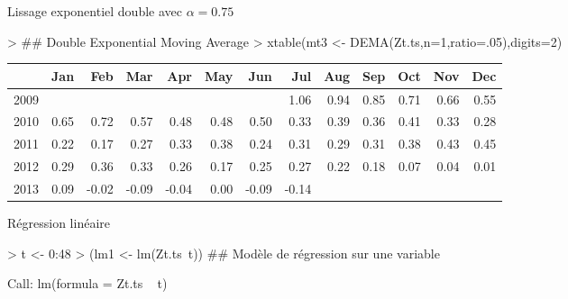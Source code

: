 \begin{solution}{1.1}
\begin{enumerate}
\begin{Schunk}
\begin{table}[ht]
\begin{tabular}{rrrrrrrrrrrrr}
   \hline
\end{tabular}
\end{table}\end{Schunk}
Lissage exponentiel double avec $\alpha=0.75$
\begin{Schunk}
\begin{Sinput}
> ## Double Exponential Moving Average
> xtable(mt3 <- DEMA(Zt.ts,n=1,ratio=.05),digits=2)
\end{Sinput}
\begin{table}[ht]
\centering
\begin{tabular}{rrrrrrrrrrrrr}
  \hline
 & Jan & Feb & Mar & Apr & May & Jun & Jul & Aug & Sep & Oct & Nov & Dec \\
  \hline
2009 &  &  &  &  &  &  & 1.06 & 0.94 & 0.85 & 0.71 & 0.66 & 0.55 \\
  2010 & 0.65 & 0.72 & 0.57 & 0.48 & 0.48 & 0.50 & 0.33 & 0.39 & 0.36 & 0.41 & 0.33 & 0.28 \\
  2011 & 0.22 & 0.17 & 0.27 & 0.33 & 0.38 & 0.24 & 0.31 & 0.29 & 0.31 & 0.38 & 0.43 & 0.45 \\
  2012 & 0.29 & 0.36 & 0.33 & 0.26 & 0.17 & 0.25 & 0.27 & 0.22 & 0.18 & 0.07 & 0.04 & 0.01 \\
  2013 & 0.09 & -0.02 & -0.09 & -0.04 & 0.00 & -0.09 & -0.14 &  &  &  &  &  \\
   \hline
\end{tabular}
\end{table}\end{Schunk}
Régression linéaire
\begin{Schunk}
\begin{Sinput}
> t <- 0:48
> (lm1 <- lm(Zt.ts~t)) ## Modèle de régression sur une variable
\end{Sinput}
\begin{Soutput}
Call:
lm(formula = Zt.ts ~ t)


\end{Soutput}
\end{Schunk}
\end{enumerate}
\end{solution}
